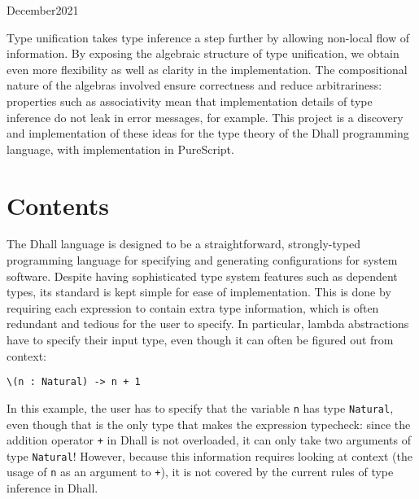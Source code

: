 \documentclass[11pt, twoside, reqno]{book}
\makeatletter
\renewcommand\tableofcontents{%
    \if@twocolumn
      \@restonecoltrue\onecolumn
    \else
      \@restonecolfalse
    \fi
    \chapter*{\contentsname
        \@mkboth{%
           \contentsname}{\contentsname}}%
    \@starttoc{toc}%
    \if@restonecol\twocolumn\fi
    }
\makeatother
\begin{document}
\renewcommand{\contentsname}{Contents}
\fancyhead[LE]{\textit{\nouppercase{\leftmark}}}
\fancyhead[RO]{\textit{\nouppercase{\rightmark}}}

    {December}{2021}

\abstr

Type unification takes type inference a step further by allowing non-local flow of information. By exposing the algebraic structure of type unification, we obtain even more flexibility as well as clarity in the implementation. The compositional nature of the algebras involved ensure correctness and reduce arbitrariness: properties such as associativity mean that implementation details of type inference do not leak in error messages, for example. This project is a discovery and implementation of these ideas for the type theory of the Dhall programming language, with implementation in PureScript.


\tableofcontents





\startmain


\intro

The Dhall language is designed to be a straightforward, strongly-typed programming language for specifying and generating configurations for system software.
Despite having sophisticated type system features such as dependent types, its standard is kept simple for ease of implementation.
This is done by requiring each expression to contain extra type information, which is often redundant and tedious for the user to specify.
In particular, lambda abstractions have to specify their input type, even though it can often be figured out from context:
\begin{verbatim}
\(n : Natural) -> n + 1
\end{verbatim}
In this example, the user has to specify that the variable \verb`n` has type \verb`Natural`, even though that is the only type that makes the expression typecheck: since the addition operator \verb`+` in Dhall is not overloaded, it can only take two arguments of type \verb`Natural`!
However, because this information requires looking at context (the usage of \verb`n` as an argument to \verb`+`), it is not covered by the current rules of type inference in Dhall.
\end{document}
